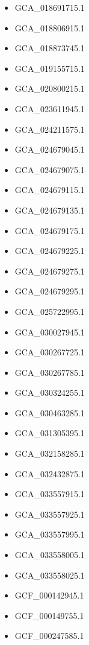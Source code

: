 \begin{itemize}
    \item GCA\_018691715.1
    \item GCA\_018806915.1
    \item GCA\_018873745.1
    \item GCA\_019155715.1
    \item GCA\_020800215.1
    \item GCA\_023611945.1
    \item GCA\_024211575.1
    \item GCA\_024679045.1
    \item GCA\_024679075.1
    \item GCA\_024679115.1
    \item GCA\_024679135.1
    \item GCA\_024679175.1
    \item GCA\_024679225.1
    \item GCA\_024679275.1
    \item GCA\_024679295.1
    \item GCA\_025722995.1
    \item GCA\_030027945.1
    \item GCA\_030267725.1
    \item GCA\_030267785.1
    \item GCA\_030324255.1
    \item GCA\_030463285.1
    \item GCA\_031305395.1
    \item GCA\_032158285.1
    \item GCA\_032432875.1
    \item GCA\_033557915.1
    \item GCA\_033557925.1
    \item GCA\_033557995.1
    \item GCA\_033558005.1
    \item GCA\_033558025.1
    \item GCF\_000142945.1
    \item GCF\_000149755.1
    \item GCF\_000247585.1
\end{itemize}

